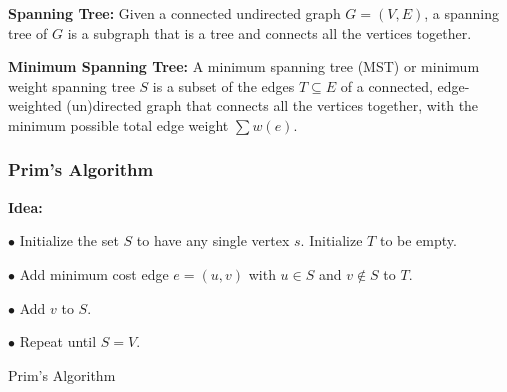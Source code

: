 \documentclass[10pt]{article}
\begin{document}
\textbf{Spanning Tree:} Given a connected undirected graph $G = (V, E)$, a spanning tree of $G$ is a subgraph that is a tree and connects all the vertices together.

\textbf{Minimum Spanning Tree:} A minimum spanning tree (MST) or minimum weight spanning tree $S$ is a subset of the edges $T \subseteq E$ of a connected, edge-weighted (un)directed graph that connects all the vertices together, with the minimum possible total edge weight $\sum w(e)$. 

\subsubsection{Prim's Algorithm}

\textbf{Idea:}

$\bullet$ Initialize the set $S$ to have any single vertex $s$. Initialize $T$ to be empty.

$\bullet$ Add minimum cost edge $e = (u, v)$ with $u \in S$ and $v \notin S$ to $T$.

$\bullet$ Add $v$ to $S$.

$\bullet$ Repeat until $S = V$.

\begin{algorithm}
	\SetAlgoLined
	
	\caption{Prim's Algorithm}

\end{algorithm}
\end{document}
